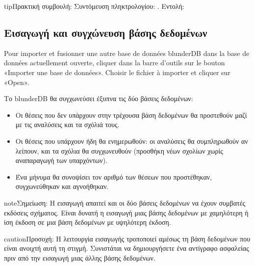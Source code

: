 \documentclass[letterpaper,10pt,greek]{sphinxmanual}
\begin{document}
\begin{sphinxadmonition}{tip}{Πρακτική συμβουλή:}
\sphinxAtStartPar
Συντόμευση πληκτρολογίου: . Εντολή: 
\end{sphinxadmonition}


\subsection{Εισαγωγή και συγχώνευση βάσης δεδομένων}
\label{\detokenize{guide_utilisateur:importer-et-fusionner-une-base-de-donnees}}
\sphinxAtStartPar
Pour importer et fusionner une autre base de données blunderDB dans la base de
données actuellement ouverte, cliquer dans la barre d’outils sur le bouton
«Importer une base de données». Choisir le fichier  à importer et
cliquer sur «Open».

\sphinxAtStartPar
Το blunderDB θα συγχωνεύσει έξυπνα τις δύο βάσεις δεδομένων:
\begin{itemize}
\item {} 
\sphinxAtStartPar
Οι θέσεις που δεν υπάρχουν στην τρέχουσα βάση δεδομένων θα προστεθούν μαζί με τις αναλύσεις και τα σχόλιά τους.

\item {} 
\sphinxAtStartPar
Οι θέσεις που υπάρχουν ήδη θα ενημερωθούν: οι αναλύσεις θα συμπληρωθούν αν λείπουν, και τα σχόλια θα συγχωνευθούν (προσθήκη νέων σχολίων χωρίς αναπαραγωγή των υπαρχόντων).

\item {} 
\sphinxAtStartPar
Ένα μήνυμα θα συνοψίσει τον αριθμό των θέσεων που προστέθηκαν, συγχωνεύθηκαν και αγνοήθηκαν.

\end{itemize}

\begin{sphinxadmonition}{note}{Σημείωση:}
\sphinxAtStartPar
Η εισαγωγή απαιτεί και οι δύο βάσεις δεδομένων να έχουν συμβατές εκδόσεις σχήματος. Είναι δυνατή η εισαγωγή μιας βάσης δεδομένων με χαμηλότερη ή ίση έκδοση σε μια βάση δεδομένων με υψηλότερη έκδοση.
\end{sphinxadmonition}

\begin{sphinxadmonition}{caution}{Προσοχή:}
\sphinxAtStartPar
Η λειτουργία εισαγωγής τροποποιεί αμέσως τη βάση δεδομένων που είναι ανοιχτή αυτή τη στιγμή. Συνιστάται να δημιουργήσετε ένα αντίγραφο ασφαλείας πριν από την εισαγωγή μιας άλλης βάσης δεδομένων.
\end{sphinxadmonition}
\end{document}
